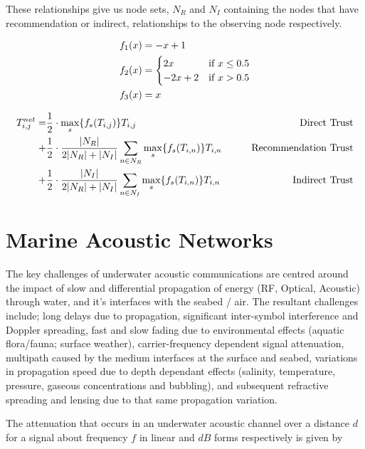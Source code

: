 \documentclass[runningheads,a4paper]{llncs}
\begin{document}
These relationships give us node sets, $N_R$ and $N_I$ containing the nodes that have recommendation or indirect, relationships to the observing node respectively.

\begin{align}
  \label{eq:whitenization}
  f_1(x) &= -x+1\notag\\
  f_2(x) &= 
  \begin{cases}
    2x & \text{if }x\leq 0.5\\
    -2x+2 & \text{if }x>0.5
  \end{cases}\\
  f_3(x) &= x\notag
\end{align}

\begin{align}
  \label{eq:networkeffects}
  T_{i,j}^{net}=&\frac{1}{2} \cdot \max_s\{f_s(T_{i,j})\} T_{i,j}&\qquad \text{Direct Trust}\notag \\
  +&\frac{1}{2} \cdot \frac{|N_R| }{2|N_R| + |N_I|}\sum_{n \in N_R} \max_s\{f_s(T_{i,n})\} T_{i,n}&\qquad \text{Recommendation Trust}\notag\\
  +&\frac{1}{2} \cdot \frac{|N_I| }{2|N_R| + |N_I|}\sum_{n \in N_I} \max_s\{f_s(T_{i,n})\} T_{i,n} &\qquad \text{Indirect Trust}
\end{align}


\section{Marine Acoustic Networks}\label{sec:marineacousticnetworks}

The key challenges of underwater acoustic communications are centred around the impact of slow and differential propagation of energy (RF, Optical, Acoustic) through water, and it's interfaces with the seabed / air.
The resultant challenges include; long delays due to propagation, significant inter-symbol interference and Doppler spreading, fast and slow fading due to environmental effects (aquatic flora/fauna; surface weather), carrier-frequency dependent signal attenuation, multipath caused by the medium interfaces at the surface and seabed, variations in propagation speed due to depth dependant effects (salinity, temperature, pressure, gaseous concentrations and bubbling), and subsequent refractive spreading and lensing due to that same propagation variation\cite{Partan2006}.

The attenuation that occurs in an underwater acoustic channel over a distance $d$ for a signal about frequency $f$ in linear and $dB$ forms respectively is given by
\end{document}
